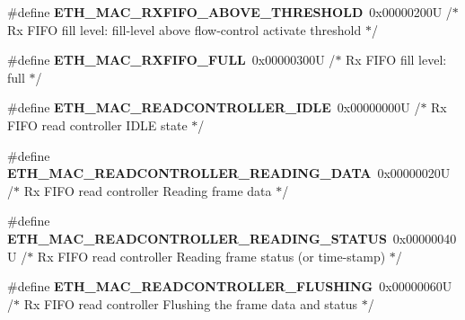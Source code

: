 \begin{DoxyCompactItemize}
\mbox{\label{group___h_a_l___e_t_h___aliased___defines_ga10d4ac5728fe85efe0ec19699e4c90f0}} 
\#define {\bfseries E\+T\+H\+\_\+\+M\+A\+C\+\_\+\+R\+X\+F\+I\+F\+O\+\_\+\+A\+B\+O\+V\+E\+\_\+\+T\+H\+R\+E\+S\+H\+O\+LD}~0x00000200\+U  /$\ast$ Rx F\+I\+F\+O fill level\+: fill-\/level above flow-\/control activate threshold $\ast$/
\item 
\mbox{\label{group___h_a_l___e_t_h___aliased___defines_gaa7b77138ec3256a713a8aa74ea94f0c1}} 
\#define {\bfseries E\+T\+H\+\_\+\+M\+A\+C\+\_\+\+R\+X\+F\+I\+F\+O\+\_\+\+F\+U\+LL}~0x00000300\+U  /$\ast$ Rx F\+I\+F\+O fill level\+: full $\ast$/
\item 
\mbox{\label{group___h_a_l___e_t_h___aliased___defines_ga0be388dadd31f6a12f2ee9b4ee6c31bb}} 
\#define {\bfseries E\+T\+H\+\_\+\+M\+A\+C\+\_\+\+R\+E\+A\+D\+C\+O\+N\+T\+R\+O\+L\+L\+E\+R\+\_\+\+I\+D\+LE}~0x00000000\+U  /$\ast$ Rx F\+I\+F\+O read controller I\+D\+L\+E state $\ast$/
\item 
\mbox{\label{group___h_a_l___e_t_h___aliased___defines_ga056b776e92442c623c3d848314e6c8f0}} 
\#define {\bfseries E\+T\+H\+\_\+\+M\+A\+C\+\_\+\+R\+E\+A\+D\+C\+O\+N\+T\+R\+O\+L\+L\+E\+R\+\_\+\+R\+E\+A\+D\+I\+N\+G\+\_\+\+D\+A\+TA}~0x00000020\+U  /$\ast$ Rx F\+I\+F\+O read controller Reading frame data $\ast$/
\item 
\mbox{\label{group___h_a_l___e_t_h___aliased___defines_ga441228e7ee2416d37f22f5081d739e2c}} 
\#define {\bfseries E\+T\+H\+\_\+\+M\+A\+C\+\_\+\+R\+E\+A\+D\+C\+O\+N\+T\+R\+O\+L\+L\+E\+R\+\_\+\+R\+E\+A\+D\+I\+N\+G\+\_\+\+S\+T\+A\+T\+US}~0x00000040\+U  /$\ast$ Rx F\+I\+F\+O read controller Reading frame status (or time-\/stamp) $\ast$/
\item 
\mbox{\label{group___h_a_l___e_t_h___aliased___defines_ga7a4fe56723328085b9b80adbfb528a5d}} 
\#define {\bfseries E\+T\+H\+\_\+\+M\+A\+C\+\_\+\+R\+E\+A\+D\+C\+O\+N\+T\+R\+O\+L\+L\+E\+R\+\_\+\+F\+L\+U\+S\+H\+I\+NG}~0x00000060\+U  /$\ast$ Rx F\+I\+F\+O read controller Flushing the frame data and status $\ast$/
\item 

\end{DoxyCompactItemize}
